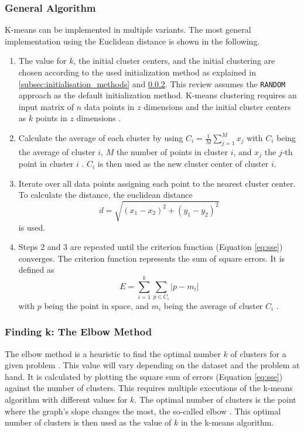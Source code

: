 \subsubsection{General Algorithm}
\label{subsec:general_algorithm}
K-means can be implemented in multiple variants.
The most general implementation using the Euclidean distance is shown in the following.
\begin{enumerate}
    \item The value for $k$, the initial cluster centers, and the initial clustering are chosen according to the used initialization method as explained in \ref{subsec:initialisation_methods} and \ref{subsec:finding_k}.
          This review assumes the \texttt{RANDOM} approach as the default initialization method.
          K-means clustering requires an input matrix of $n$ data points in $z$ dimensions and the initial cluster centers as $k$ points in $z$ dimensions \cite{HAR-KMA}.
    \item Calculate the average of each cluster by using $C_i = \frac{1}{M} \sum_{j=1}^{M}x_j$ with $C_i$ being the average of cluster $i$, $M$ the number of points in cluster $i$, and $x_j$ the $j$-th point in cluster $i$ \cite{SYA-IKC}.
          $C_i$ is then used as the new cluster center of cluster $i$.
    \item Iterate over all data points assigning each point to the nearest cluster center.
          To calculate the distance, the euclidean distance \begin{equation}\label{eq:euclidean_distance}d = \sqrt{(x_1-x_2)^2+(y_1-y_2)^2}\end{equation} is used.
    \item Steps 2 and 3 are repeated until the criterion function (Equation \ref{eq:sse}) converges.
          The criterion function represents the sum of square errors.
          It is defined as \begin{equation}\label{eq:sse}E=\sum_{i=1}^{k} \sum_{p \in C_i}|p-m_i|\end{equation} with $p$ being the point in space, and $m_i$ being the average of cluster $C_i$ \cite{LIU-BDE}.
\end{enumerate}

\subsubsection{Finding k: The Elbow Method}
\label{subsec:finding_k}
The elbow method is a heuristic to find the optimal number $k$ of clusters for a given problem \cite{SYA-IKC}.
This value will vary depending on the dataset and the problem at hand.
It is calculated by plotting the square sum of errors (Equation \ref{eq:sse}) against the number of clusters.
This requires multiple executions of the k-means algorithm with different values for $k$.
The optimal number of clusters is the point where the graph's slope changes the most, the so-called elbow \cite{SYA-IKC}.
This optimal number of clusters is then used as the value of $k$ in the k-means algorithm.

